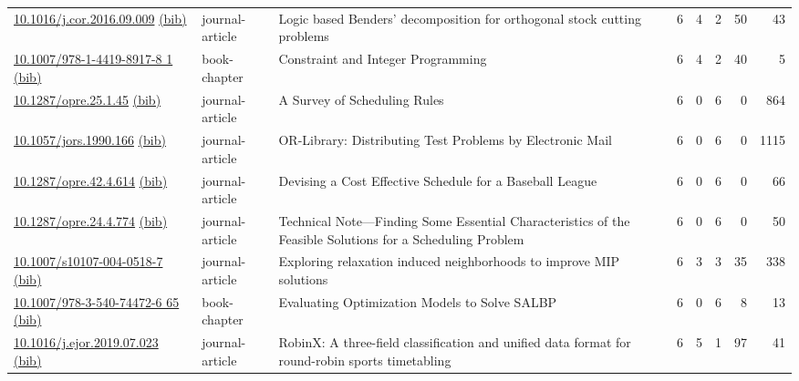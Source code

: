 {\begin{longtable}{p{5cm}lp{11cm}rrrrr}
\href{http://dx.doi.org/10.1016/j.cor.2016.09.009}{10.1016/j.cor.2016.09.009} \href{https://www.doi2bib.org/bib/10.1016/j.cor.2016.09.009}{(bib)} & journal-article & Logic based Benders' decomposition for orthogonal stock cutting problems & 6 & 4 & 2 & 50 & 43 \\
\href{http://dx.doi.org/10.1007/978-1-4419-8917-8_1}{10.1007/978-1-4419-8917-8 1} \href{https://www.doi2bib.org/bib/10.1007/978-1-4419-8917-8_1}{(bib)} & book-chapter & Constraint and Integer Programming & 6 & 4 & 2 & 40 & 5 \\
\href{http://dx.doi.org/10.1287/opre.25.1.45}{10.1287/opre.25.1.45} \href{https://www.doi2bib.org/bib/10.1287/opre.25.1.45}{(bib)} & journal-article & A Survey of Scheduling Rules & 6 & 0 & 6 & 0 & 864 \\
\href{http://dx.doi.org/10.1057/jors.1990.166}{10.1057/jors.1990.166} \href{https://www.doi2bib.org/bib/10.1057/jors.1990.166}{(bib)} & journal-article & OR-Library: Distributing Test Problems by Electronic Mail & 6 & 0 & 6 & 0 & 1115 \\
\href{http://dx.doi.org/10.1287/opre.42.4.614}{10.1287/opre.42.4.614} \href{https://www.doi2bib.org/bib/10.1287/opre.42.4.614}{(bib)} & journal-article & Devising a Cost Effective Schedule for a Baseball League & 6 & 0 & 6 & 0 & 66 \\
\href{http://dx.doi.org/10.1287/opre.24.4.774}{10.1287/opre.24.4.774} \href{https://www.doi2bib.org/bib/10.1287/opre.24.4.774}{(bib)} & journal-article & Technical Note—Finding Some Essential Characteristics of the Feasible Solutions for a Scheduling Problem & 6 & 0 & 6 & 0 & 50 \\
\href{http://dx.doi.org/10.1007/s10107-004-0518-7}{10.1007/s10107-004-0518-7} \href{https://www.doi2bib.org/bib/10.1007/s10107-004-0518-7}{(bib)} & journal-article & Exploring relaxation induced neighborhoods to improve MIP solutions & 6 & 3 & 3 & 35 & 338 \\
\href{http://dx.doi.org/10.1007/978-3-540-74472-6_65}{10.1007/978-3-540-74472-6 65} \href{https://www.doi2bib.org/bib/10.1007/978-3-540-74472-6_65}{(bib)} & book-chapter & Evaluating Optimization Models to Solve SALBP & 6 & 0 & 6 & 8 & 13 \\
\href{http://dx.doi.org/10.1016/j.ejor.2019.07.023}{10.1016/j.ejor.2019.07.023} \href{https://www.doi2bib.org/bib/10.1016/j.ejor.2019.07.023}{(bib)} & journal-article & RobinX: A three-field classification and unified data format for round-robin sports timetabling & 6 & 5 & 1 & 97 & 41 \\

\end{longtable}}
